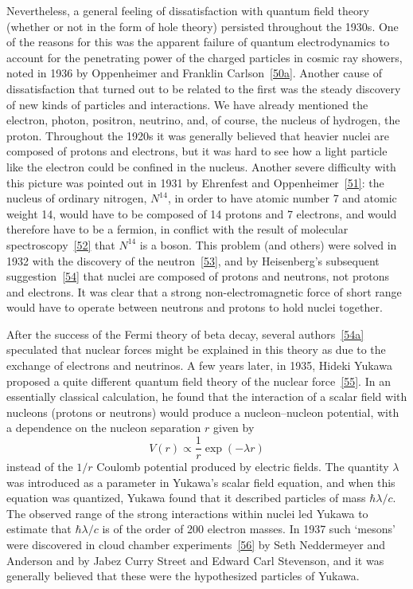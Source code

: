 Nevertheless, a general feeling of dissatisfaction with quantum field theory
(whether or not in the form of hole theory) persisted throughout the 1930s.
One of the reasons for this was the apparent failure of quantum
electrodynamics to account for the penetrating power of the charged particles
in cosmic ray showers, noted in 1936 by Oppenheimer and Franklin Carlson~\hyperref[ref:1.50a]{[50a]}.
Another cause of dissatisfaction that turned out to be related to the first
was the steady discovery of new kinds of particles and interactions. We have
already mentioned the electron, photon, positron, neutrino, and, of course,
the nucleus of hydrogen, the proton. Throughout the 1920s it was generally
believed that heavier nuclei are composed of protons and electrons, but it was
hard to see how a light particle like the electron could be confined in the
nucleus. Another severe difficulty with this picture was pointed out in 1931
by Ehrenfest and Oppenheimer~\hyperref[ref:1.51]{[51]}: the nucleus of ordinary nitrogen,
$N^{14}$, in order to have atomic number 7 and atomic weight 14, would
have to be composed of 14 protons and 7 electrons, and would therefore have
to be a fermion, in conflict with the result of molecular spectroscopy~\hyperref[ref:1.52]{[52]}
that $N^{14}$ is a boson. This problem (and others) were solved in
1932 with the discovery of the neutron~\hyperref[ref:1.53]{[53]}, and by Heisenberg's subsequent
suggestion~\hyperref[ref:1.54]{[54]} that nuclei are composed of protons and neutrons, not protons
and electrons. It was clear that a strong non-electromagnetic force of short
range would have to operate between neutrons and protons to hold nuclei
together.

After the success of the Fermi theory of beta decay, several authors~\hyperref[ref:1.54a]{[54a]}
speculated that nuclear forces might be explained in this theory as due to the
exchange of electrons and neutrinos. A few years later, in 1935, Hideki Yukawa
proposed a quite different quantum field theory of the nuclear force~\hyperref[ref:1.55]{[55]}. In
an essentially classical calculation, he found that the interaction of a
scalar field with nucleons (protons or neutrons) would produce a
nucleon--nucleon potential, with a dependence on the nucleon separation $r$
given by
\begin{equation}
  V(r)\propto\frac{1}{r}\exp(-\lambda r)
  \tag{1.2.74}\label{eq:1.2.74}
\end{equation}
instead of the $1/r$ Coulomb potential produced by electric fields. The
quantity $\lambda$ was introduced as a parameter in Yukawa's scalar field
equation, and when this equation was quantized, Yukawa found that it described
particles of mass $\hbar\lambda/c$. The observed range of the strong
interactions within nuclei led Yukawa to estimate that $\hbar\lambda/c$ is of
the order of 200 electron masses. In 1937 such `mesons' were discovered in
cloud chamber experiments~\hyperref[ref:1.56]{[56]} by Seth Neddermeyer and Anderson and by Jabez
Curry Street and Edward Carl Stevenson, and it was generally believed that
these were the hypothesized particles of Yukawa.

